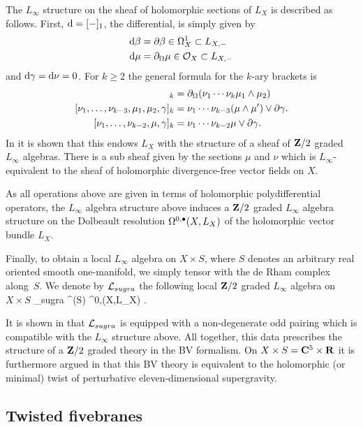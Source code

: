 The $L_\infty$ structure on the sheaf of holomorphic sections of $L_X$ is described as follows. 
First, ${\rm d} = [-]_1$, the differential, is simply given by 
\begin{align*}
{\rm d} \beta & = \partial \beta \in \Omega^1_X \subset L_{X,-} \\
{\rm d} \mu & = \partial_{\Omega} \mu \in \mathcal O_X \subset L_{X, -}
\end{align*}
and ${\rm d} \gamma = {\rm d} \nu = 0$. 
For $k \geq 2$ the general formula for the $k$-ary brackets is 
\begin{align*}
[\nu_1, \ldots, \nu_{k-2}, \mu_1,\mu_2]_{k} & = \div(\nu_1 \cdots \nu_k \mu_1 \wedge \mu_2) \\
[\nu_1,\ldots, \nu_{k-3}, \mu_1,\mu_2,\gamma]_k & = \nu_1 \cdots \nu_{k-3} (\mu \wedge \mu') \vee \del \gamma .\\
[\nu_1,\ldots,\nu_{k-2}, \mu, \gamma]_k & = \nu_1 \cdots \nu_{k-2} \mu \vee \del \gamma .
\end{align*}
In \cite{RSW} it is shown that this endows $L_{X}$ with the structure of a sheaf of $\mathbf{Z}/2$ graded $L_\infty$ algebras.
There is a sub sheaf given by the sections $\mu$ and $\nu$ which is $L_\infty$-equivalent to the sheaf of holomorphic divergence-free vector fields on $X$. 

As all operations above are given in terms of holomorphic polydifferential operators, the $L_\infty$ algebra structure above induces a $\mathbf{Z}/2$ graded $L_\infty$ algebra structure on the Dolbeault resolution $\Omega^{0,\bullet}(X,L_X)$ of the holomorphic vector bundle $L_X$.

Finally, to obtain a local $L_\infty$ algebra on $X \times S$, where $S$ denotes an arbitrary real oriented smooth one-manifold, we simply tensor with the de Rham complex along~$S$.
We denote by $\mathcal L_{sugra}$ the following local $\mathbf{Z}/2$ graded $L_\infty$ algebra on $X \times S$
\beqn
\cL_{sugra}  \Omega^\bu(S) \hotimes \Omega^{0,\bu}(X,L_X) .
\eeqn

\parsec[s:rsw]
It is shown in \cite{RSW} that $\mathcal L_{sugra}$ is equipped with a non-degenerate odd pairing which is compatible with the $L_\infty$ structure above. 
All together, this data prescribes the structure of a $\mathbf{Z}/2$ graded theory in the BV formalism. 
On $X \times S = \mathbf{C}^5 \times \mathbf{R}$ it is furthermore argued in \cite{RSW} that this BV theory is equivalent to the holomorphic (or minimal) twist of perturbative eleven-dimensional supergravity. 


\subsection{Twisted fivebranes} 

